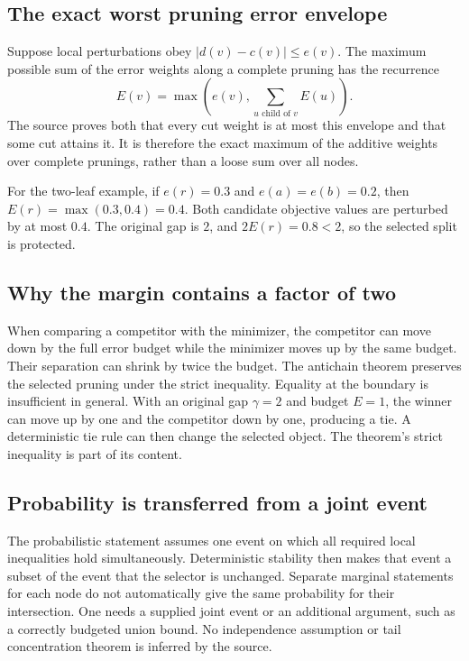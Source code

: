 \subsection{The exact worst pruning error envelope}
Suppose local perturbations obey $|d(v)-c(v)|\le e(v)$. The maximum possible sum of the error weights along a complete pruning has the recurrence
\[
E(v)=\max\left(e(v),\sum_{u\text{ child of }v}E(u)\right).
\]
The source proves both that every cut weight is at most this envelope and that some cut attains it. It is therefore the exact maximum of the additive weights over complete prunings, rather than a loose sum over all nodes.

For the two-leaf example, if $e(r)=0.3$ and $e(a)=e(b)=0.2$, then $E(r)=\max(0.3,0.4)=0.4$. Both candidate objective values are perturbed by at most $0.4$. The original gap is $2$, and $2E(r)=0.8<2$, so the selected split is protected.

\subsection{Why the margin contains a factor of two}
When comparing a competitor with the minimizer, the competitor can move down by the full error budget while the minimizer moves up by the same budget. Their separation can shrink by twice the budget. The antichain theorem preserves the selected pruning under the strict inequality.
Equality at the boundary is insufficient in general. With an original gap $\gamma=2$ and budget $E=1$, the winner can move up by one and the competitor down by one, producing a tie. A deterministic tie rule can then change the selected object. The theorem's strict inequality is part of its content.

\subsection{Probability is transferred from a joint event}
The probabilistic statement assumes one event on which all required local inequalities hold simultaneously. Deterministic stability then makes that event a subset of the event that the selector is unchanged.
Separate marginal statements for each node do not automatically give the same probability for their intersection. One needs a supplied joint event or an additional argument, such as a correctly budgeted union bound. No independence assumption or tail concentration theorem is inferred by the source.

